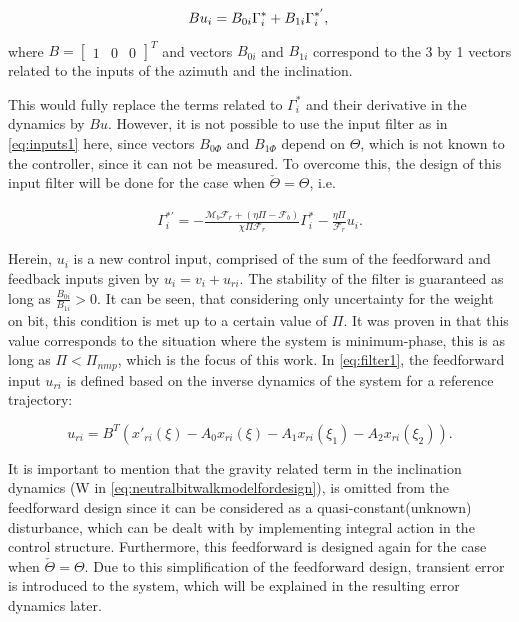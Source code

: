 \documentclass[main.tex]{subfiles}
\begin{document}
	\begin{equation}
		B u_i = B_{0i}\Gamma_i^* + B_{1i}\Gamma_i^{*'}, 	\label{eq:inputs1}\\
	\end{equation}
	
	where $B = \begin{bmatrix} 1 & 0 & 0\end{bmatrix}^T$ and vectors $B_{0i}$ and $B_{1i}$ correspond to the 3 by 1 vectors related to the inputs of the azimuth and the inclination.
	
	This would fully replace the terms related to $\Gamma_i^*$ and their derivative in the dynamics by $Bu$. However, it is not possible to use the input filter as in \eqref{eq:inputs1} here, since vectors $B_{0\Phi}$ and $B_{1\Phi}$ depend on $\Theta$, which is not known to the controller, since it can not be measured. To overcome this, the design of this input filter will be done for the case when $\check{\Theta} = \Theta$, i.e.
	
	\begin{align}
	\Gamma_{i}^{*'} = -\frac{\mathcal{M}_b \mathcal{F}_r + (\eta \Pi - \mathcal{F}_b)}{\chi \Pi \mathcal{F}_r}\Gamma_{i}^{*} - \frac{\eta \Pi}{\mathcal{F}_r}u_i. \label{eq:filter1} 	
	\end{align}	
	
	Herein, $u_i$ is a new control input, comprised of the sum of the feedforward and feedback inputs given by $u_i = v_i + u_{ri}$. The stability of the filter is guaranteed as long as $\frac{B_{0i}}{B_{1i}} > 0$. It can be seen, that considering only uncertainty for the weight on bit, this condition is met up to a certain value of $\Pi$. It was proven in \cite{Kremers2013} that this value corresponds to the situation where the system is minimum-phase, this is as long as $\Pi < \Pi_{nmp}$, which is the focus of this work. In \eqref{eq:filter1}, the feedforward input $u_{ri}$ is defined based on the inverse dynamics of the system for a reference trajectory:
	
	\begin{equation}
	u_{ri} = B^T (x'_{ri}(\xi) - A_0 x_{ri}(\xi) - A_1 x_{ri}(\xi_1) - A_2 x_{ri}(\xi_2)).
	\label{eq:feedforward}
	\end{equation}
	
	It is important to mention that the gravity related term in the inclination dynamics (W in \eqref{eq:neutralbitwalkmodelfordesign}), is omitted from the feedforward design since it can be considered as a quasi-constant(unknown) disturbance, which can be dealt with by implementing integral action in the control structure. Furthermore, this feedforward is designed again for the case when $\check{\Theta} = \Theta$. Due to this simplification of the feedforward design, transient error is introduced to the system, which will be explained in the resulting error dynamics later.
\end{document}
